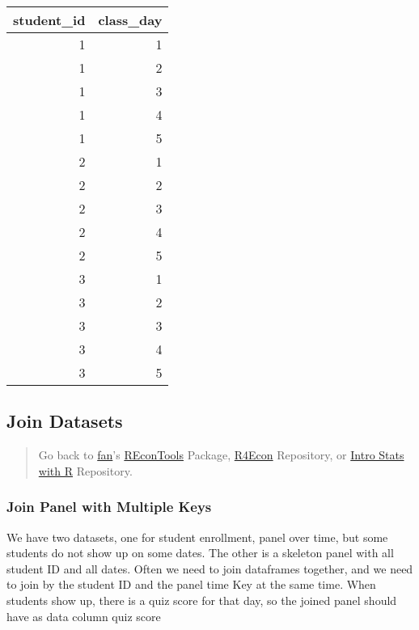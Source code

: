 \documentclass[
]{book}
\begin{document}
\begin{table}[!h]
\centering
\begin{tabular}{r|r}
\hline
student\_id & class\_day\\
\hline
\rowcolor{gray!6}  1 & 1\\
\hline
1 & 2\\
\hline
\rowcolor{gray!6}  1 & 3\\
\hline
1 & 4\\
\hline
\rowcolor{gray!6}  1 & 5\\
\hline
2 & 1\\
\hline
\rowcolor{gray!6}  2 & 2\\
\hline
2 & 3\\
\hline
\rowcolor{gray!6}  2 & 4\\
\hline
2 & 5\\
\hline
\rowcolor{gray!6}  3 & 1\\
\hline
3 & 2\\
\hline
\rowcolor{gray!6}  3 & 3\\
\hline
3 & 4\\
\hline
\rowcolor{gray!6}  3 & 5\\
\hline
\end{tabular}
\end{table}

\hypertarget{join-datasets}{%
\subsection{Join Datasets}\label{join-datasets}}

\begin{quote}
Go back to \href{http://fanwangecon.github.io/CodeDynaAsset/}{fan}'s \href{https://fanwangecon.github.io/REconTools/}{REconTools} Package, \href{https://fanwangecon.github.io/R4Econ/}{R4Econ} Repository, or \href{https://fanwangecon.github.io/Stat4Econ/}{Intro Stats with R} Repository.
\end{quote}

\hypertarget{join-panel-with-multiple-keys}{%
\subsubsection{Join Panel with Multiple Keys}\label{join-panel-with-multiple-keys}}

We have two datasets, one for student enrollment, panel over time, but some students do not show up on some dates. The other is a skeleton panel with all student ID and all dates. Often we need to join dataframes together, and we need to join by the student ID and the panel time Key at the same time. When students show up, there is a quiz score for that day, so the joined panel should have as data column quiz score
\end{document}
